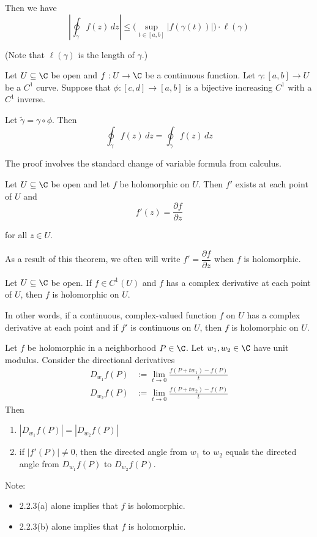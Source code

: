 Then we have
$$
	\left|\oint_\gamma f(z)\,dz\right|\leq
	\Big(\sup_{t\in[a,b]}|f(\gamma(t))|\Big)\cdot\ell(\gamma)
$$

(Note that $\ell(\gamma)$ is the length of $\gamma$.)

\label{f74efcb}

Let $U\subseteq\C$ be open and $f:U\to\C$ be a continuous function.
Let $\gamma:[a,b]\to U$ be a $C^1$ curve. Suppose that
$\phi:[c,d]\to[a,b]$ is a bijective increasing $C^1$ with a $C^1$
inverse.


Let $\tilde\gamma=\gamma\circ\phi$. Then
$$\oint_{\tilde\gamma}f(z)\,dz=\oint_\gamma f(z)\,dz$$

The proof involves the standard change of variable formula from
calculus.

\label{f75e43c}

Let $U\subseteq\C$ be open and let $f$ be holomorphic on $U$. Then
$f'$ exists at each point of $U$ and
$$f'(z)=\frac{\partial f}{\partial z}$$

for all $z\in U$.

As a result of this theorem, we often will write $f'=\dfrac{\partial
		f}{\partial z}$ when $f$ is holomorphic.

\label{d037b0f}

Let $U\subseteq\C$ be open. If $f\in C^1(U)$ and $f$ has a complex
derivative at each point of $U$, then $f$ is holomorphic on $U$.

In other words, if a continuous, complex-valued function $f$ on $U$ has
a complex derivative at each point and if $f'$ is continuous on $U$,
then $f$ is holomorphic on $U$.

\label{c41052e}

Let $f$ be holomorphic in a neighborhood $P\in\C$. Let $w_1,w_2\in\C$
have unit modulus. Consider the directional derivatives
\begin{align*}
	D_{w_1}f(P) & :=\lim_{t\to0}\frac{f(P+tw_1)-f(P)}t \\
	D_{w_2}f(P) & :=\lim_{t\to0}\frac{f(P+tw_2)-f(P)}t
\end{align*}
Then
\begin{enumerate}[label=(\alph*)]
	\item $|D_{w_1}f(P)|=|D_{w_2}f(P)|$
	\item if $|f'(P)|\neq0$, then the directed angle from $w_1$ to
	      $w_2$ equals the directed angle from $D_{w_1}f(P)$ to $D_{w_2}f(P)$.
\end{enumerate}
Note:
\begin{itemize}
	\item 2.2.3(a) alone implies that $f$ is holomorphic.
	\item 2.2.3(b) alone implies that $f$ is holomorphic.
\end{itemize}

